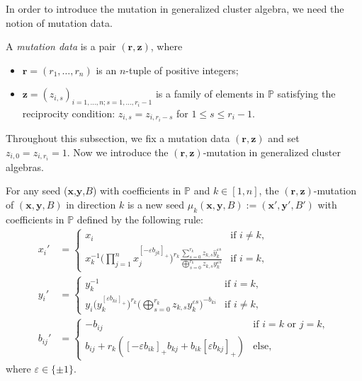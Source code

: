 \documentclass[10pt,a4paper]{amsart}
\numberwithin{equation}{section}
\begin{document}
In order to introduce the mutation in generalized cluster algebra, we need the notion of mutation data.
\begin{Definition}\label{D5}
 A {\it mutation data} is a pair $(\mathbf{r},\mathbf{z})$, where
 \begin{itemize}\itemsep=0pt
 \item $\mathbf{r}=(r_1,\dots,r_n)$ is an $n$-tuple of positive integers;
 \item $\mathbf{z}=(z_{i,s})_{i=1,\dots,n;s=1,\dots,r_{i}-1}$ is a family of elements in $\mathbb{P}$ satisfying the reciprocity condition: $z_{i,s}=z_{i,r_i-s}$ for $1\leq s\leq r_{i}-1$.
 \end{itemize}
\end{Definition}
Throughout this subsection, we fix a mutation data $(\mathbf{r},\mathbf{z})$ and set $z_{i,0}=z_{i,r_i}=1$. Now we introduce the $(\mathbf{r},\mathbf{z})$-mutation in generalized cluster algebras.
\begin{Definition}\label{D6}
 For any seed ($\mathbf{x}$,$\mathbf{y}$,$B$) with coefficients in $\mathbb{P}$ and $k\in[1,n]$, the $(\mathbf{r},\mathbf{z})$-mutation of $(\mathbf{x},\mathbf{y},B)$ in direction $k$ is a new seed $\mu_k(\mathbf{x},\mathbf{y},B):=(\mathbf{x}',\mathbf{y}',B') $ with coefficients in $\mathbb{P}$ defined by the following rule:
\begin{align}
x_i'&=
\begin{cases}
 x_i & \text{if $i\neq k$}, \\
 \displaystyle x_k^{-1}\biggl(\prod\limits_{j=1}^{n}x_j^{[-\varepsilon b_{jk}]_+}\biggr)^{r_k}\frac{\sum\limits_{s=0}^{r_k}z_{k,s}\hat{y}_k^{\varepsilon s}}{\mathop{\bigoplus}\limits_{s=0}^{r_k}z_{k,s}y_k^{\varepsilon s}}& \text{if $i=k$},
\end{cases}\label{E4}
\\
 y_i'&=
\begin{cases}
 y_k^{-1} & \text{if $i= k$}, \\
\displaystyle y_i\bigl(y_k^{[\varepsilon b_{ki}]_+}\bigr)^{r_k}\biggl(\mathop{\bigoplus}\limits_{s=0}^{r_k}z_{k,s}y_k^{\varepsilon s}\biggr)^{-b_{ki}}& \text{if $i\neq k$},
\end{cases}\label{E5}
 \\
 b_{ij}'&=
 \begin{cases}
-b_{ij} &\text{if $i=k$ or $j=k$},\\
b_{ij}+r_k([-\varepsilon b_{ik}]_+b_{kj}+b_{ik}[\varepsilon b_{kj}]_+) &\text{else},
\end{cases}\label{E6}
\end{align}
where $\varepsilon\in\{\pm 1\}$.
\end{Definition}
\end{document}

